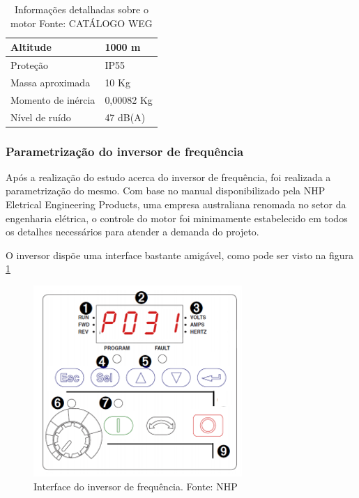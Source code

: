 \begin{table}[H]
\begin{center}
\begin{tabular}{|p{5cm}|p{5cm}|}
                Altitude & 1000 m
                \\ \hline
                Proteção & IP55
                \\ \hline
                Massa aproximada & 10 Kg
                \\ \hline
                Momento de inércia & 0,00082 Kg
                \\ \hline
                Nível de ruído & 47 dB(A)
                \\ \hline
              \end{tabular}
              \caption[Informações detalhadas sobre o motor]{Informações detalhadas sobre o motor
              \protect Fonte: CATÁLOGO WEG }
            \label{tabela_info_motor}
        \end{center}
    \end{table}


\subsubsection*{Parametrização do inversor de frequência}

Após a realização do estudo acerca do inversor de frequência, foi realizada a parametrização do mesmo. Com base no manual disponibilizado pela NHP Eletrical Engineering Products, uma empresa australiana renomada no setor da engenharia elétrica, o controle do motor foi minimamente estabelecido em todos os detalhes necessários para atender a demanda do projeto.


    O inversor dispõe uma interface bastante amigável, como pode ser visto na figura \ref{Interface do inversor}

\begin{figure}[H]
    \centering
        \includegraphics[keepaspectratio=true,scale=0.6]{figuras/interface_inversor.png}
    \caption{Interface do inversor de frequência. Fonte: NHP}
    \label{Interface do inversor}
\end{figure}

